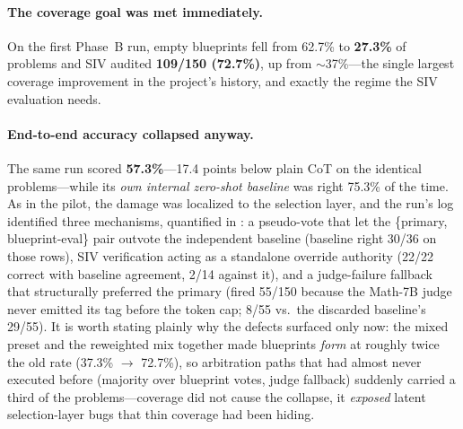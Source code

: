 \documentclass[11pt,a4paper]{article}
\begin{document}
\paragraph{The coverage goal was met immediately.}
On the first Phase~B run, empty blueprints fell from 62.7\% to \textbf{27.3\%} of problems and SIV audited \textbf{109/150 (72.7\%)}, up from $\sim$37\%---the single largest coverage improvement in the project's history, and exactly the regime the SIV evaluation needs.

\paragraph{End-to-end accuracy collapsed anyway.}
The same run scored \textbf{57.3\%}---17.4 points below plain CoT on the identical problems---while its \emph{own internal zero-shot baseline} was right 75.3\% of the time.
As in the pilot, the damage was localized to the selection layer, and the run's log identified three mechanisms, quantified in : a pseudo-vote that let the \{primary, blueprint-eval\} pair outvote the independent baseline (baseline right 30/36 on those rows), SIV verification acting as a standalone override authority (22/22 correct with baseline agreement, 2/14 against it), and a judge-failure fallback that structurally preferred the primary (fired 55/150 because the Math-7B judge never emitted its tag before the token cap; 8/55 vs.\ the discarded baseline's 29/55).
It is worth stating plainly why the defects surfaced only now: the mixed preset and the reweighted mix together made blueprints \emph{form} at roughly twice the old rate (37.3\% $\to$ 72.7\%), so arbitration paths that had almost never executed before (majority over blueprint votes, judge fallback) suddenly carried a third of the problems---coverage did not cause the collapse, it \emph{exposed} latent selection-layer bugs that thin coverage had been hiding.
\end{document}
